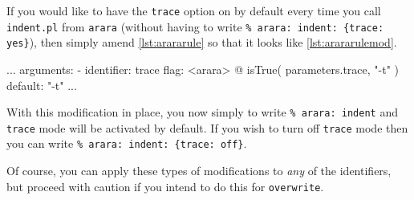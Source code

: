 If you would like to have the \lstinline!trace! option on by default every time you 
call \lstinline!indent.pl! from \lstinline!arara! (without having to write \lstinline!% arara: indent: {trace: yes}!), then simply
amend \cref{lst:arararule} so that it looks like \cref{lst:arararulemod}.
\begin{yaml}[caption={The \lstinline!arara! rule (modified)},label={lst:arararulemod},numbers=none]
...
arguments:
- identifier: trace
  flag: <arara> @{ isTrue( parameters.trace, "-t" ) }
  default: "-t"
...
\end{yaml}

With this modification in place, you now simply to write \lstinline!% arara: indent! and 
\lstinline!trace! mode will be activated by default. If you wish to turn off \lstinline!trace!
mode then you can write \lstinline!% arara: indent: {trace: off}!.

Of course, you can apply these types of modifications to \emph{any} of the identifiers, 
but proceed with caution if you intend to do this for \lstinline!overwrite!.


